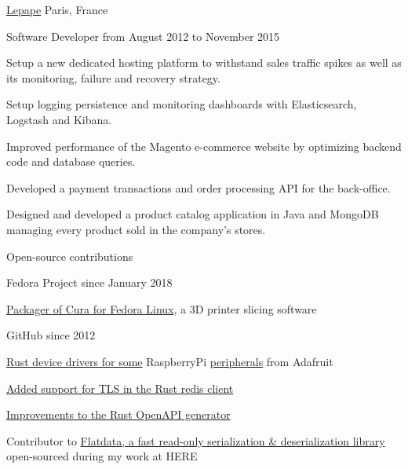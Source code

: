 \documentclass[10pt, a4paper]{awesome-cv}
\begin{document}
\begin{cventries}

	\cventrytitle
	{\href{https://www.lepape.com}{Lepape}}
	{Paris, France}

	\cventry
	{Software Developer}
	{from August 2012 to November 2015}
	{
		\begin{cvitems}
			\item {Setup a new dedicated hosting platform to withstand sales traffic spikes as well as its monitoring, failure and recovery strategy.}
			\item {Setup logging persistence and monitoring dashboards with Elasticsearch, Logstash and Kibana.}
			\item {Improved performance of the Magento e-commerce website by optimizing backend code and database queries.}
			\item {Developed a payment transactions and order processing API for the back-office.}
			\item {Designed and developed a product catalog application in Java and MongoDB managing every product sold in the company's stores.}
		\end{cvitems}
	}
\end{cventries}
\vspace{6pt}

\begin{cventries}
	\cventrytitle
	{Open-source contributions}
	{}

	\cventry
	{Fedora Project}
	{since January 2018}
	{
		\begin{cvitems}
			\item{\href{https://src.fedoraproject.org/rpms/cura}{Packager of Cura for Fedora Linux}, a 3D printer slicing software}
		\end{cvitems}
	}

	\cventry
	{GitHub}
	{since 2012}
	{
		\begin{cvitems}
			\item {\href{https://github.com/gferon/rustberrypi-playground}{Rust device drivers for some} RaspberryPi \href{https://github.com/gferon/am2320.rs}{peripherals} from Adafruit}
			\item {\href{https://github.com/mitsuhiko/redis-rs/pull/305}{Added support for TLS in the Rust redis client}}
			\item {\href{https://github.com/OpenAPITools/openapi-generator/pulls?q=is\%3Apr+author\%3Agferon+is\%3Aclosed}{Improvements to the Rust OpenAPI generator}}
			\item {Contributor to \href{https://github.com/heremaps/flatdata}{Flatdata, a fast read-only serialization \& deserialization library} open-sourced during my work at HERE}
		\end{cvitems}
	}
\end{cventries}
\vspace{6pt}
\end{document}
